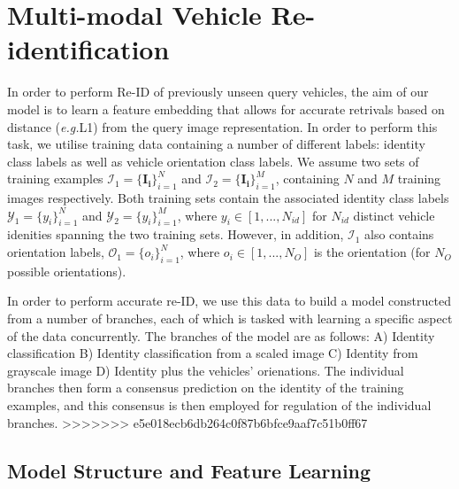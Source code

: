 \documentclass[10pt,twocolumn,letterpaper]{article}
\def\eg{\emph{e.g.\hspace{0.3em}}}
\begin{document}
\section{Multi-modal Vehicle Re-identification}

In order to perform Re-ID of previously unseen query vehicles, the aim of our model is to learn a feature embedding that allows for accurate retrivals based on distance (\eg L1) from the query image representation. In order to perform this task, we utilise training data containing a number of different labels: identity class labels as well as vehicle orientation class labels.
We assume two sets of training examples $\mathcal{I}_1 = \{\mathbf{I_i}\}_{i=1}^N$ and $\mathcal{I}_2 = \{\mathbf{I_i}\}_{i=1}^M$, containing $N$ and $M$ training images respectively. Both training sets contain the associated identity class labels $\mathcal{Y}_1=\{y_i\}_{i=1}^N$ and $\mathcal{Y}_2=\{y_i\}_{i=1}^M$, where $y_i \in \left[1,...,N_{id}\right]$ for $N_{id}$ distinct vehicle idenities spanning the two training sets. However, in addition, $\mathcal{I}_1$ also contains orientation labels, $\mathcal{O_1}=\{o_i\}_{i=1}^N$, where $o_i \in \left[1,...,N_O\right]$ is the orientation (for $N_O$ possible orientations).

In order to perform accurate re-ID, we use this data to build a model constructed from a number of branches, each of which is tasked with learning a specific aspect of the data concurrently. The branches of the model are as follows: A) Identity classification B) Identity classification from a scaled image C) Identity from grayscale image D) Identity plus the vehicles' orienations. The individual branches then form a consensus prediction on the identity of the training examples, and this consensus is then employed for regulation of the individual branches.
>>>>>>> e5e018ecb6db264c0f87b6bfce9aaf7c51b0ff67

\subsection{Model Structure and Feature Learning}
\end{document}
